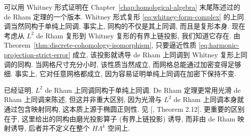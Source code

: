 可以用 Whitney 形式证明在 Chapter~\ref{chap:homological-algebra} 末尾陈述过的 de Rham 定理的一个版本. Whitney 形式复形 \eqref{eq:whitney-form-complex} 的上同调当然同构于单纯上同调. 事实上, 同构的不仅是其上同调, 而且是复形本身. 现在考虑从 $L^2$ de Rham 复形到 Whitney 复形的有界上链投影, 我们知道它存在. 由 Theorem~\ref{thm:discrete-cohomology-isomorphism}, 只要逼近性质 \eqref{eq:harmonic-projection-strict-error} 成立, 该投影就诱导 de Rham 上同调到 Whitney 复形上同调的同构. 当网格尺寸充分小时, 该性质当然成立, 而网格总能通过加密变得足够细. 事实上, 它对任意网格都成立, 因为容易证明单纯上同调在加密下保持不变.

\begin{Remark}\label{rem:de-rham-cohomology-isomorphism}
已经证明, $L^2$ de Rham 上同调同构于单纯上同调. De Rham 定理更常用光滑 de Rham 上同调来陈述, 但这并非重大区别, 因为光滑与 $L^2$ de Rham 上同调本身就通过包含映射同构, 这本质上源于椭圆正则性. 见 [, Theorem 2.12]. 更重要的区别在于, 这里给出的同构由磨光投影算子 (有界上链投影) 诱导, 而非由 de Rham 映射诱导, 后者并不定义在整个 $H\Lambda^k$ 空间上.
\end{Remark}
